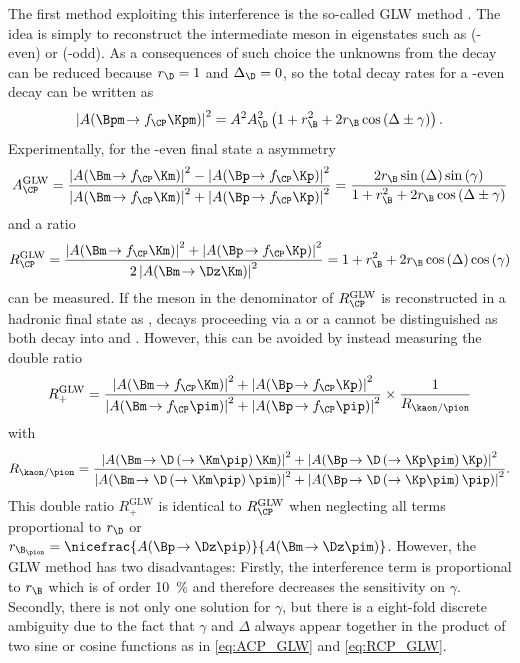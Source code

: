 The first method exploiting this interference is the so-called GLW method \cite{GLW_1, GLW_2}.
The idea is simply to reconstruct the intermediate \D meson in \CP eigenstates such as \Kp\Km (\CP-even) or \KS\piz (\CP-odd).
As a consequences of such choice the unknowns from the \D decay can be reduced because $r_\D=1$ and $\Delta_\D=0$, so the total decay rates for \eg a \CP-even \D decay can be written as
\begin{equation}
\left|A\!\left(\Bpm\!\to f_{\CP}\Kpm\right)\right|^2=A^2A_\D^2\left(1+r_\B^2+2r_\B\cos\left(\Delta\pm\gamma\right)\right).\label{eq:totDecRateGLW}
\end{equation}
Experimentally, for the \CP-even final state a \CP asymmetry
\begin{equation}
A_{\CP}^{\text{GLW}}=\frac{\left|A\!\left(\Bm\!\to f_{\CP}\Km\right)\right|^2-\left|A\!\left(\Bp\!\to f_{\CP}\Kp\right)\right|^2}{\left|A\!\left(\Bm\!\to f_{\CP}\Km\right)\right|^2+\left|A\!\left(\Bp\!\to f_{\CP}\Kp\right)\right|^2}=\frac{2r_\B\sin\left(\Delta\right)\sin\left(\gamma\right)}{1+r_\B^2+2r_\B\cos\left(\Delta\pm\gamma\right)}\label{eq:ACP_GLW}
\end{equation}
and a \CP ratio
\begin{equation}
R_{\CP}^{\text{GLW}}=\frac{\left|A\!\left(\Bm\!\to f_{\CP}\Km\right)\right|^2+\left|A\!\left(\Bp\!\to f_{\CP}\Kp\right)\right|^2}{2\left|A\!\left(\Bm\!\to\Dz\Km\right)\right|^2}=1+r_\B^2+2r_\B\cos\left(\Delta\right)\cos\left(\gamma\right)\label{eq:RCP_GLW}
\end{equation}
can be measured.
If the \D meson in the denominator of $R_{\CP}^{\text{GLW}}$ is reconstructed in a hadronic final state as \kaon\pion, decays proceeding via a \Dz or a \Dzb cannot be distinguished as both decay into \Kp\pim and \Km\pip.
However, this can be avoided by instead measuring the double ratio
\begin{equation}
R_{+}^{\text{GLW}}=\frac{\left|A\!\left(\Bm\!\to f_{\CP}\Km\right)\right|^2+\left|A\!\left(\Bp\!\to f_{\CP}\Kp\right)\right|^2}{\left|A\!\left(\Bm\!\to f_{\CP}\pim\right)\right|^2+\left|A\!\left(\Bp\!\to f_{\CP}\pip\right)\right|^2}\times\frac{1}{R_{\kaon/\pion}}
\end{equation}
with
\begin{equation}
R_{\kaon/\pion}=\frac{\left|A\!\left(\Bm\!\to \D\left(\to\Km\pip\right)\Km\right)\right|^2+\left|A\!\left(\Bp\!\to \D\left(\to\Kp\pim\right)\Kp\right)\right|^2}{\left|A\!\left(\Bm\!\to \D\left(\to\Km\pip\right)\pim\right)\right|^2+\left|A\!\left(\Bp\!\to \D\left(\to\Kp\pim\right)\pip\right)\right|^2}.
\end{equation}
This double ratio $R_{+}^{\text{GLW}}$ is identical to $R_{\CP}^{\text{GLW}}$ when neglecting all terms proportional to $r_\D$ or $r_{\B_\pion}=\nicefrac{A\!\left(\Bp\!\to\Dz\pip\right)}{A\!\left(\Bm\!\to\Dz\pim\right)}$.
However, the GLW method has two disadvantages: Firstly, the interference term is proportional to $r_\B$ which is of order \SI{10}{\percent} and therefore decreases the sensitivity on $\gamma$.
Secondly, there is not only one solution for $\gamma$, but there is a eight-fold discrete ambiguity due to the fact that $\gamma$ and $\Delta$ always appear together in the product of two sine or cosine functions as in \cref{eq:ACP_GLW} and \cref{eq:RCP_GLW}.

